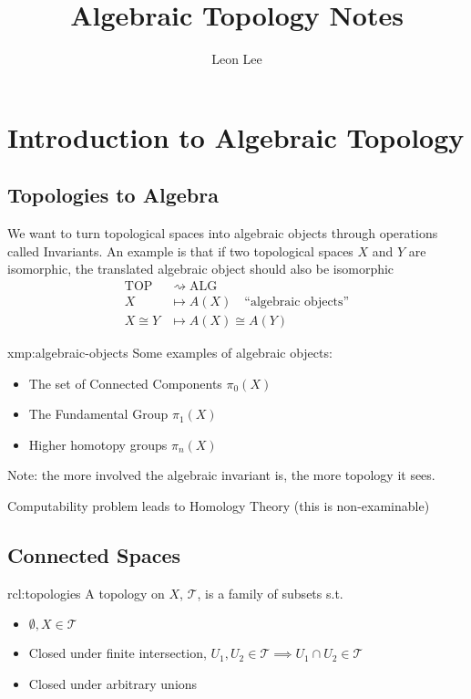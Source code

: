 \documentclass{article}
\title{Algebraic Topology Notes}
\author{Leon Lee}
\begin{document}
\maketitle
\newpage
\tableofcontents
\newpage

\section{Introduction to Algebraic Topology}
\subsection{Topologies to Algebra}

We want to turn topological spaces into algebraic objects through operations called Invariants. An example is that if two topological spaces $X$ and $Y$ are isomorphic, the translated algebraic object should also be isomorphic
\begin{align*}
    \mathrm{TOP} &\rightsquigarrow \mathrm{ALG}\\
    X &\mapsto A(X) \quad\text{``algebraic objects''}\\
    X \cong Y &\mapsto A(X) \cong A(Y)
\end{align*}

\begin{xmp}{xmp:algebraic-objects}{}
    Some examples of algebraic objects:
    \begin{itemize}
        \item The set of Connected Components $\pi_{0}(X)$
        \item The Fundamental Group $\pi_{1}(X)$
        \item Higher homotopy groups $\pi_{n}(X)$
    \end{itemize}
\end{xmp}

Note: the more involved the algebraic invariant is, the more topology it sees.

Computability problem leads to Homology Theory (this is non-examinable)

\subsection{Connected Spaces}

\begin{rcl}[Topologies]{rcl:topologies}{}
    A topology on $X$, $\mathcal{T}$, is a family of subsets s.t.
    \begin{itemize}
        \item $\emptyset, X \in \mathcal{T}$
        \item Closed under finite intersection, $U_{1}, U_{2}\in \mathcal{T} \implies U_{1} \cap U_{2} \in \mathcal{T}$
        \item Closed under arbitrary unions
    \end{itemize}
\end{rcl}
\end{document}
